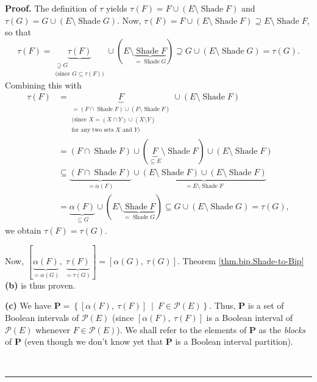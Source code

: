 \documentclass[numbers=enddot,12pt,final,onecolumn]{scrartcl}%
\theoremstyle{definition}
\newenvironment{proof}[1][Proof]{\noindent\textbf{#1.} }{\ \rule{0.5em}{0.5em}}
\begin{document}
\begin{proof}
The definition of $\tau$ yields $\tau\left(  F\right)  =F\cup\left(
E\setminus\operatorname*{Shade}F\right)  $ and $\tau\left(  G\right)
=G\cup\left(  E\setminus\operatorname*{Shade}G\right)  $. Now, $\tau\left(
F\right)  =F\cup\left(  E\setminus\operatorname*{Shade}F\right)  \supseteq
E\setminus\operatorname*{Shade}F$, so that%
\[
\tau\left(  F\right)  =\underbrace{\tau\left(  F\right)  }%
_{\substack{\supseteq G\\\text{(since }G\subseteq\tau\left(  F\right)
\text{)}}}\cup\left(  E\setminus\underbrace{\operatorname*{Shade}%
F}_{=\operatorname*{Shade}G}\right)  \supseteq G\cup\left(  E\setminus
\operatorname*{Shade}G\right)  =\tau\left(  G\right)  .
\]
Combining this with%
\begin{align*}
\tau\left(  F\right)   &  =\underbrace{F}_{\substack{=\left(  F\cap
\operatorname*{Shade}F\right)  \cup\left(  F\setminus\operatorname*{Shade}%
F\right)  \\\text{(since }X=\left(  X\cap Y\right)  \cup\left(  X\setminus
Y\right)  \\\text{for any two sets }X\text{ and }Y\text{)}}}\cup\left(
E\setminus\operatorname*{Shade}F\right) \\
&  =\left(  F\cap\operatorname*{Shade}F\right)  \cup\left(  \underbrace{F}%
_{\subseteq E}\setminus\operatorname*{Shade}F\right)  \cup\left(
E\setminus\operatorname*{Shade}F\right) \\
&  \subseteq\underbrace{\left(  F\cap\operatorname*{Shade}F\right)  }%
_{=\alpha\left(  F\right)  }\cup\underbrace{\left(  E\setminus
\operatorname*{Shade}F\right)  \cup\left(  E\setminus\operatorname*{Shade}%
F\right)  }_{=E\setminus\operatorname*{Shade}F}\\
&  =\underbrace{\alpha\left(  F\right)  }_{\subseteq G}\cup\left(
E\setminus\underbrace{\operatorname*{Shade}F}_{=\operatorname*{Shade}%
G}\right)  \subseteq G\cup\left(  E\setminus\operatorname*{Shade}G\right)
=\tau\left(  G\right)  ,
\end{align*}
we obtain $\tau\left(  F\right)  =\tau\left(  G\right)  $.

Now, $\left[  \underbrace{\alpha\left(  F\right)  }_{=\alpha\left(  G\right)
},\ \underbrace{\tau\left(  F\right)  }_{=\tau\left(  G\right)  }\right]
=\left[  \alpha\left(  G\right)  ,\ \tau\left(  G\right)  \right]  $. Theorem
\ref{thm.bip.Shade-to-Bip} \textbf{(b)} is thus proven.

\textbf{(c)} We have $\mathbf{P}=\left\{  \left[  \alpha\left(  F\right)
,\ \tau\left(  F\right)  \right]  \ \mid\ F\in\mathcal{P}\left(  E\right)
\right\}  $. Thus, $\mathbf{P}$ is a set of Boolean intervals of
$\mathcal{P}\left(  E\right)  $ (since $\left[  \alpha\left(  F\right)
,\ \tau\left(  F\right)  \right]  $ is a Boolean interval of $\mathcal{P}%
\left(  E\right)  $ whenever $F\in\mathcal{P}\left(  E\right)  $). We shall
refer to the elements of $\mathbf{P}$ as the \emph{blocks} of $\mathbf{P}$
(even though we don't know yet that $\mathbf{P}$ is a Boolean interval partition).


\end{proof}
\end{document}
